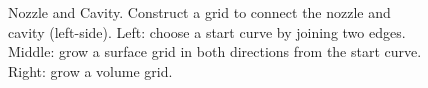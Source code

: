 


{
\begin{figure}[hbt]
\newcommand{\figWidtha}{6cm}
\newcommand{\trimfig}[2]{\trimFigb{#1}{#2}{0}{.0}{.1}{.1}}
\begin{center}
\end{center}
\caption{Nozzle and Cavity. Construct a grid to connect the nozzle and cavity (left-side). 
Left: choose a start curve by joining two edges. Middle: grow a surface grid in both directions
from the start curve. Right: grow a volume grid.}
\label{fig:nozzleAndCavityLeftCorner}
\end{figure}
}


